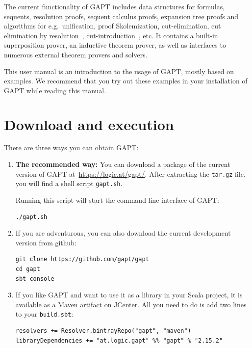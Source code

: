 \documentclass[a4paper,11pt]{book}
\begin{document}
The current functionality of GAPT includes data structures for formulas,
sequents, resolution proofs, sequent calculus proofs, expansion tree proofs and
algorithms for e.g.\ unification, proof Skolemization, cut-elimination, cut
elimination by resolution~\cite{Baaz00CutElimination},
cut-introduction~\cite{Hetzl2012}, etc. It contains a built-in superposition
prover, an inductive theorem prover, as well as interfaces to numerous external
theorem provers and solvers.

This user manual is an introduction to the usage of GAPT, mostly based on examples.
We recommend that you try out these examples in your installation of GAPT while
reading this manual.

\chapter{Download and execution}

There are three ways you can obtain GAPT:

\begin{enumerate}

\item {\bfseries The recommended way:}  You can download a package of the current
version of GAPT at~\url{https://logic.at/gapt/}.  After extracting
the \texttt{tar.gz}-file, you will find a shell script \texttt{gapt.sh}.

Running this script will start the command line interface of GAPT:
\begin{lstlisting}
./gapt.sh
\end{lstlisting}

\item If you are adventurous, you can also download the current development
  version from github:
\begin{lstlisting}
git clone https://github.com/gapt/gapt
cd gapt
sbt console
\end{lstlisting}

\item If you like GAPT and want to use it as a library in your Scala project,
  it is available as a Maven artifact on JCenter.  All you need to do is add
  two lines to your \verb,build.sbt,:
\begin{lstlisting}
resolvers += Resolver.bintrayRepo("gapt", "maven")
libraryDependencies += "at.logic.gapt" %% "gapt" % "2.15.2"
\end{lstlisting}

\end{enumerate}
\end{document}
